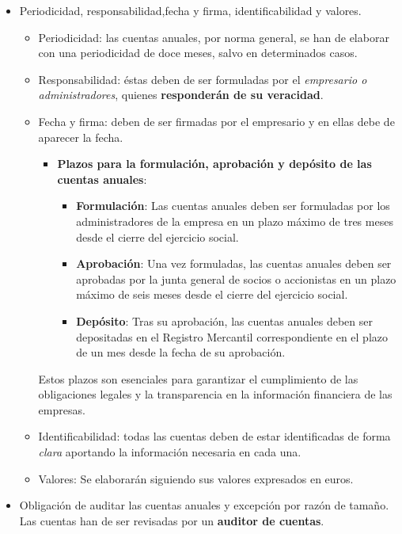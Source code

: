 \documentclass[
  paper=a4,
  ,captions=tableheading
]{scrbook}
\providecommand{\tightlist}{%
  \setlength{\itemsep}{0pt}\setlength{\parskip}{0pt}}
\begin{document}
\begin{itemize}
\tightlist
\item
  Periodicidad, responsabilidad,fecha y firma, identificabilidad y
  valores.

  \begin{itemize}
  \tightlist
  \item
    Periodicidad: las cuentas anuales, por norma general, se han de
    elaborar con una periodicidad de doce meses, salvo en determinados
    casos.
  \item
    Responsabilidad: éstas deben de ser formuladas por el
    \emph{empresario o administradores}, quienes \textbf{responderán de
    su veracidad}.
  \item
    Fecha y firma: deben de ser firmadas por el empresario y en ellas
    debe de aparecer la fecha.

    \begin{itemize}
    \tightlist
    \item
      \textbf{Plazos para la formulación, aprobación y depósito de las
      cuentas anuales}:

      \begin{itemize}
      \tightlist
      \item
        \textbf{Formulación}: Las cuentas anuales deben ser formuladas
        por los administradores de la empresa en un plazo máximo de tres
        meses desde el cierre del ejercicio social.
      \item
        \textbf{Aprobación}: Una vez formuladas, las cuentas anuales
        deben ser aprobadas por la junta general de socios o accionistas
        en un plazo máximo de seis meses desde el cierre del ejercicio
        social.
      \item
        \textbf{Depósito}: Tras su aprobación, las cuentas anuales deben
        ser depositadas en el Registro Mercantil correspondiente en el
        plazo de un mes desde la fecha de su aprobación.
      \end{itemize}
    \end{itemize}

    Estos plazos son esenciales para garantizar el cumplimiento de las
    obligaciones legales y la transparencia en la información financiera
    de las empresas.
  \item
    Identificabilidad: todas las cuentas deben de estar identificadas de
    forma \emph{clara} aportando la información necesaria en cada una.
  \item
    Valores: Se elaborarán siguiendo sus valores expresados en euros.
  \end{itemize}
\item
  Obligación de auditar las cuentas anuales y excepción por razón de
  tamaño. Las cuentas han de ser revisadas por un \textbf{auditor de
  cuentas}.


\end{itemize}
\end{document}
